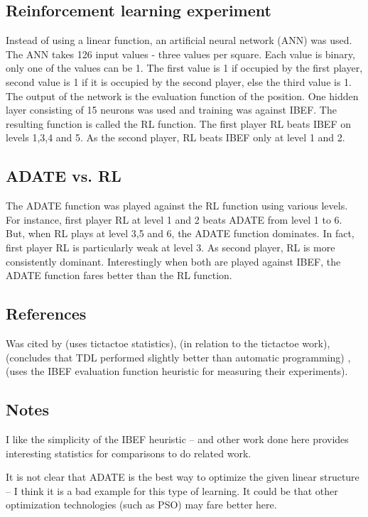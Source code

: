 \subsection{Reinforcement learning experiment}  Instead of using a linear function, an artificial neural network (ANN) was used. The ANN takes 126 input values - three values per square. Each value is binary, only one of the values can be 1. The first value is 1 if occupied by the first player, second value is 1 if it is occupied by the second player, else the third value is 1.  The output of the network is the evaluation function of the position. One hidden layer consisting of 15 neurons was used and training was against IBEF.  The resulting function is called the RL function.  The first player RL beats IBEF on levels 1,3,4 and 5.  As the second player, RL beats IBEF only at level 1 and 2.  

\subsection{ADATE vs. RL}
The ADATE function was played against the RL function using various levels. For instance, first player RL at level 1 and 2 beats ADATE from level 1 to 6. But, when RL plays at level 3,5 and 6, the ADATE function dominates.  In fact, first player RL is particularly weak at level 3. As second player, RL  is more consistently dominant. Interestingly when both are played against IBEF, the ADATE function fares better than the RL function.   

\subsection{References} Was cited by \cite{konen:failures} (uses tictactoe statistics), \cite{konen:games} (in relation to the tictactoe work), \cite{thill:connect-4} (concludes that TDL performed slightly better than automatic programming) ,\cite{diez:minimax} (uses the IBEF evaluation function heuristic for measuring their experiments).

\subsection{Notes} I like the simplicity of the IBEF heuristic -- and other work done here provides interesting statistics for comparisons to do related work.    

It is not clear that ADATE is the best way to optimize the given linear structure -- I think it is a bad example for this type of learning.  It could be that other optimization technologies (such as PSO) may fare better here.

